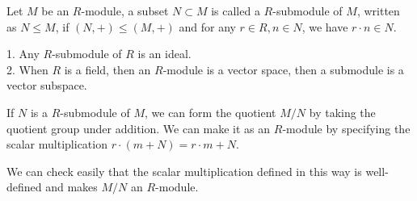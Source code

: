 \begin{definition}
    Let $M$ be an $R$-module, a subset $N\subset M$ is called a $R$-submodule of $M$, written as $N\le M$, if $(N,+)\le (M,+)$ and for any $r\in R,n\in N$, we have $r\cdot n\in N$.
\end{definition}
\begin{example}
    1. Any $R$-submodule of $R$ is an ideal.\\
    2. When $R$ is a field, then an $R$-module is a vector space, then a submodule is a vector subspace.
\end{example}
\begin{definition}
    If $N$ is a $R$-submodule of $M$, we can form the quotient $M/N$ by taking the quotient group under addition.
    We can make it as an $R$-module by specifying the scalar multiplication $r\cdot (m+N)=r\cdot m+N$.
\end{definition}
We can check easily that the scalar multiplication defined in this way is well-defined and makes $M/N$ an $R$-module.
